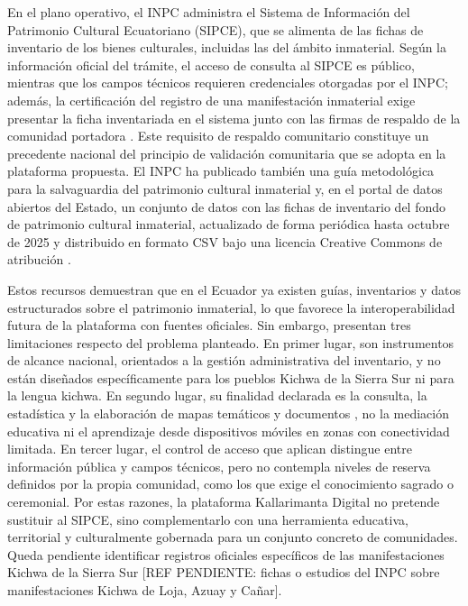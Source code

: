 En el plano operativo, el INPC administra el Sistema de Información del Patrimonio Cultural Ecuatoriano (SIPCE), que se alimenta de las fichas de inventario de los bienes culturales, incluidas las del ámbito inmaterial. Según la información oficial del trámite, el acceso de consulta al SIPCE es público, mientras que los campos técnicos requieren credenciales otorgadas por el INPC; además, la certificación del registro de una manifestación inmaterial exige presentar la ficha inventariada en el sistema junto con las firmas de respaldo de la comunidad portadora \cite{inpc2026sipce}. Este requisito de respaldo comunitario constituye un precedente nacional del principio de validación comunitaria que se adopta en la plataforma propuesta. El INPC ha publicado también una guía metodológica para la salvaguardia del patrimonio cultural inmaterial \cite{inpc2013guia} y, en el portal de datos abiertos del Estado, un conjunto de datos con las fichas de inventario del fondo de patrimonio cultural inmaterial, actualizado de forma periódica hasta octubre de 2025 y distribuido en formato CSV bajo una licencia Creative Commons de atribución \cite{inpc2025datos}.

Estos recursos demuestran que en el Ecuador ya existen guías, inventarios y datos estructurados sobre el patrimonio inmaterial, lo que favorece la interoperabilidad futura de la plataforma con fuentes oficiales. Sin embargo, presentan tres limitaciones respecto del problema planteado. En primer lugar, son instrumentos de alcance nacional, orientados a la gestión administrativa del inventario, y no están diseñados específicamente para los pueblos Kichwa de la Sierra Sur ni para la lengua kichwa. En segundo lugar, su finalidad declarada es la consulta, la estadística y la elaboración de mapas temáticos y documentos \cite{inpc2026sipce}, no la mediación educativa ni el aprendizaje desde dispositivos móviles en zonas con conectividad limitada. En tercer lugar, el control de acceso que aplican distingue entre información pública y campos técnicos, pero no contempla niveles de reserva definidos por la propia comunidad, como los que exige el conocimiento sagrado o ceremonial. Por estas razones, la plataforma Kallarimanta Digital no pretende sustituir al SIPCE, sino complementarlo con una herramienta educativa, territorial y culturalmente gobernada para un conjunto concreto de comunidades. Queda pendiente identificar registros oficiales específicos de las manifestaciones Kichwa de la Sierra Sur [REF PENDIENTE: fichas o estudios del INPC sobre manifestaciones Kichwa de Loja, Azuay y Cañar].

